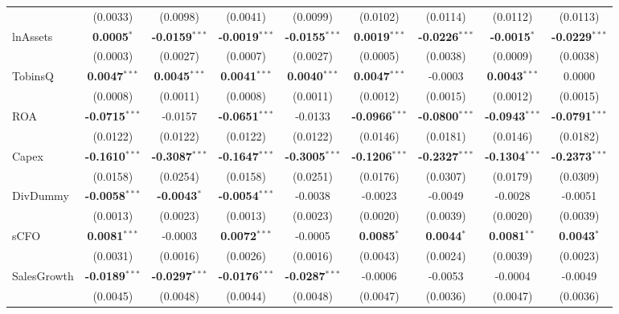 \begin{landscape}
\begin{table}[H]
\begin{tabular}{lcccccccc}
 & (0.0033) & (0.0098) & (0.0041) & (0.0099) & (0.0102) & (0.0114) & (0.0112) & (0.0113) \\
lnAssets & \textbf{0.0005}$^{*}$ & \textbf{-0.0159}$^{***}$ & \textbf{-0.0019}$^{***}$ & \textbf{-0.0155}$^{***}$ & \textbf{0.0019}$^{***}$ & \textbf{-0.0226}$^{***}$ & \textbf{-0.0015}$^{*}$ & \textbf{-0.0229}$^{***}$ \\
 & (0.0003) & (0.0027) & (0.0007) & (0.0027) & (0.0005) & (0.0038) & (0.0009) & (0.0038) \\
TobinsQ & \textbf{0.0047}$^{***}$ & \textbf{0.0045}$^{***}$ & \textbf{0.0041}$^{***}$ & \textbf{0.0040}$^{***}$ & \textbf{0.0047}$^{***}$ & -0.0003 & \textbf{0.0043}$^{***}$ & 0.0000 \\
 & (0.0008) & (0.0011) & (0.0008) & (0.0011) & (0.0012) & (0.0015) & (0.0012) & (0.0015) \\
ROA & \textbf{-0.0715}$^{***}$ & -0.0157 & \textbf{-0.0651}$^{***}$ & -0.0133 & \textbf{-0.0966}$^{***}$ & \textbf{-0.0800}$^{***}$ & \textbf{-0.0943}$^{***}$ & \textbf{-0.0791}$^{***}$ \\
 & (0.0122) & (0.0122) & (0.0122) & (0.0122) & (0.0146) & (0.0181) & (0.0146) & (0.0182) \\
Capex & \textbf{-0.1610}$^{***}$ & \textbf{-0.3087}$^{***}$ & \textbf{-0.1647}$^{***}$ & \textbf{-0.3005}$^{***}$ & \textbf{-0.1206}$^{***}$ & \textbf{-0.2327}$^{***}$ & \textbf{-0.1304}$^{***}$ & \textbf{-0.2373}$^{***}$ \\
 & (0.0158) & (0.0254) & (0.0158) & (0.0251) & (0.0176) & (0.0307) & (0.0179) & (0.0309) \\
DivDummy & \textbf{-0.0058}$^{***}$ & \textbf{-0.0043}$^{*}$ & \textbf{-0.0054}$^{***}$ & -0.0038 & -0.0023 & -0.0049 & -0.0028 & -0.0051 \\
 & (0.0013) & (0.0023) & (0.0013) & (0.0023) & (0.0020) & (0.0039) & (0.0020) & (0.0039) \\
sCFO & \textbf{0.0081}$^{***}$ & -0.0003 & \textbf{0.0072}$^{***}$ & -0.0005 & \textbf{0.0085}$^{*}$ & \textbf{0.0044}$^{*}$ & \textbf{0.0081}$^{**}$ & \textbf{0.0043}$^{*}$ \\
 & (0.0031) & (0.0016) & (0.0026) & (0.0016) & (0.0043) & (0.0024) & (0.0039) & (0.0023) \\
SalesGrowth & \textbf{-0.0189}$^{***}$ & \textbf{-0.0297}$^{***}$ & \textbf{-0.0176}$^{***}$ & \textbf{-0.0287}$^{***}$ & -0.0006 & -0.0053 & -0.0004 & -0.0049 \\
 & (0.0045) & (0.0048) & (0.0044) & (0.0048) & (0.0047) & (0.0036) & (0.0047) & (0.0036) \\

\end{tabular}
\end{table}
\end{landscape}

